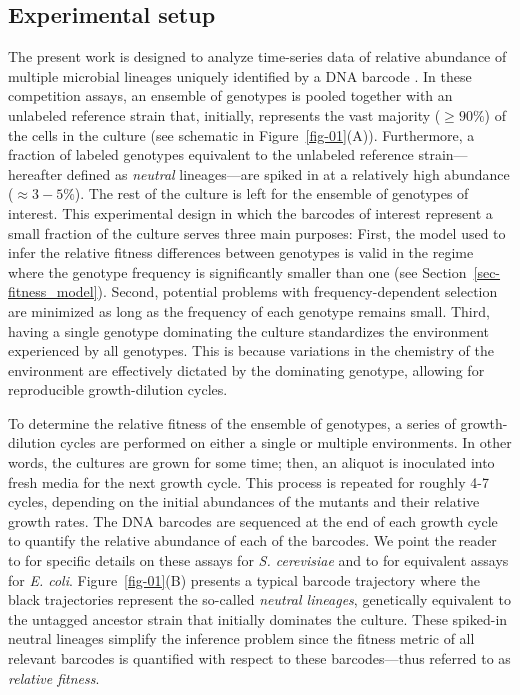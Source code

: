 \documentclass[
]{scrartcl}
\begin{document}
\begin{refsegment}
\hypertarget{sec-experiment}{%
\subsection{Experimental setup}\label{sec-experiment}}

The present work is designed to analyze time-series data of relative
abundance of multiple microbial lineages uniquely identified by a DNA
barcode \autocite{kinsler2020,ascensao2023}. In these competition
assays, an ensemble of genotypes is pooled together with an unlabeled
reference strain that, initially, represents the vast majority
(\(\geq 90\%\)) of the cells in the culture (see schematic in
Figure~\ref{fig-01}(A)). Furthermore, a fraction of labeled genotypes
equivalent to the unlabeled reference strain---hereafter defined as
\emph{neutral} lineages---are spiked in at a relatively high abundance
(\(\approx 3-5\%\)). The rest of the culture is left for the ensemble of
genotypes of interest. This experimental design in which the barcodes of
interest represent a small fraction of the culture serves three main
purposes: First, the model used to infer the relative fitness
differences between genotypes is valid in the regime where the genotype
frequency is significantly smaller than one (see
Section~\ref{sec-fitness_model}). Second, potential problems with
frequency-dependent selection are minimized as long as the frequency of
each genotype remains small. Third, having a single genotype dominating
the culture standardizes the environment experienced by all genotypes.
This is because variations in the chemistry of the environment are
effectively dictated by the dominating genotype, allowing for
reproducible growth-dilution cycles.

To determine the relative fitness of the ensemble of genotypes, a series
of growth-dilution cycles are performed on either a single or multiple
environments. In other words, the cultures are grown for some time;
then, an aliquot is inoculated into fresh media for the next growth
cycle. This process is repeated for roughly 4-7 cycles, depending on the
initial abundances of the mutants and their relative growth rates. The
DNA barcodes are sequenced at the end of each growth cycle to quantify
the relative abundance of each of the barcodes. We point the reader to
\textcite{kinsler2020} for specific details on these assays for \emph{S.
cerevisiae} and to \textcite{ascensao2023} for equivalent assays for
\emph{E. coli}. Figure~\ref{fig-01}(B) presents a typical barcode
trajectory where the black trajectories represent the so-called
\emph{neutral lineages}, genetically equivalent to the untagged ancestor
strain that initially dominates the culture. These spiked-in neutral
lineages simplify the inference problem since the fitness metric of all
relevant barcodes is quantified with respect to these barcodes---thus
referred to as \emph{relative fitness}.


\end{refsegment}
\end{document}
